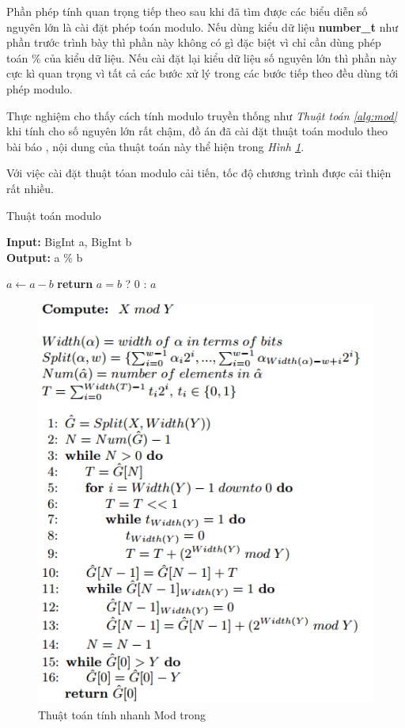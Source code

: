 Phần phép tính quan trọng tiếp theo sau khi đã tìm được các biểu diễn số nguyên lớn là cài đặt phép toán modulo. Nếu dùng kiểu dữ liệu \textbf{number\_t} 
như phần trước trình bày thì phần này không có gì đặc biệt vì chỉ cần dùng phép toán $\%$ của kiểu dữ liệu. Nếu cài đặt lại kiểu dữ liệu số nguyên lớn thì phần này cực kì quan trọng vì tất cả các bước xử lý trong các bước tiếp theo đều dùng tới phép modulo.

Thực nghiệm cho thấy cách tính modulo truyền thống như \textit{Thuật toán \ref{alg:mod}} khi tính cho số nguyên lớn rất chậm, 
đồ án đã cài đặt thuật toán modulo theo bài báo \cite{Will14computingmod}, nội dung của thuật toán này thể hiện trong  \textit{Hình \ref{fig:modwithoutmod}}.

Với việc cài đặt thuật tóan modulo cải tiến, tốc độ chương trình được cải thiện rất nhiều.
\newpage
\begin{algorithm}
\caption{Thuật toán modulo}\label{alg:mod}
\hspace*{\algorithmicindent} \textbf{Input:} BigInt a, BigInt b\\
\hspace*{\algorithmicindent} \textbf{Output:} a \% b
\begin{algorithmic}[1]
\State $a\gets a - b$
\EndWhile\label{euclidendwhile}
\State \textbf{return} $a = b $ ? 0 : $a$
\EndProcedure
\end{algorithmic}
\end{algorithm}

\begin{figure}[!h]
    \centering
    \includegraphics[width=1\textwidth]{image/mod_without_mod.PNG}
	\centering
	\caption{\label{fig:modwithoutmod} Thuật toán tính nhanh Mod trong \cite{Will14computingmod}}
\end{figure}


